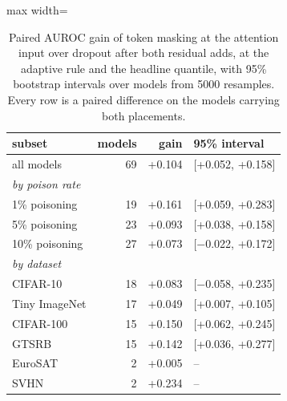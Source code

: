 \begin{table}[htbp]
\centering
\small
\caption{Paired AUROC gain of token masking at the attention input over dropout after both residual adds, at the adaptive rule and the headline quantile, with 95\% bootstrap intervals over models from 5000 resamples. Every row is a paired difference on the models carrying both placements.}
\label{tab:gains}
\begin{adjustbox}{max width=\linewidth}
\begin{tabular}{lrrl}
\toprule
subset & models & gain & 95\% interval \\
\midrule
all models & 69 & +0.104 & [+0.052, +0.158] \\
\multicolumn{4}{l}{\emph{by poison rate}} \\
1\% poisoning & 19 & +0.161 & [+0.059, +0.283] \\
5\% poisoning & 23 & +0.093 & [+0.038, +0.158] \\
10\% poisoning & 27 & +0.073 & [$-$0.022, +0.172] \\
\multicolumn{4}{l}{\emph{by dataset}} \\
CIFAR-10 & 18 & +0.083 & [$-$0.058, +0.235] \\
Tiny ImageNet & 17 & +0.049 & [+0.007, +0.105] \\
CIFAR-100 & 15 & +0.150 & [+0.062, +0.245] \\
GTSRB & 15 & +0.142 & [+0.036, +0.277] \\
EuroSAT & 2 & +0.005 & -- \\
SVHN & 2 & +0.234 & -- \\
\bottomrule
\end{tabular}
\end{adjustbox}
\end{table}
